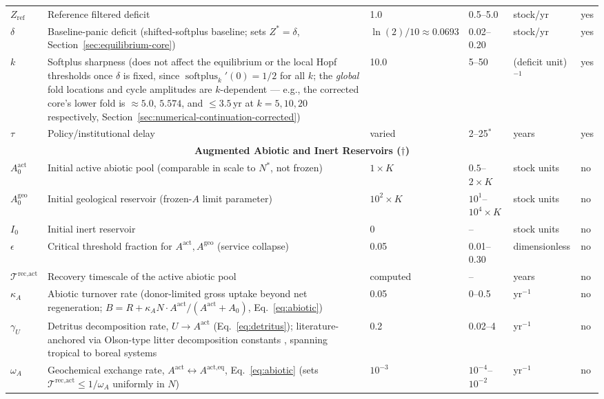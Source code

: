 \documentclass[twocolumn,10pt]{article}
\begin{document}
\begin{table}[t]
\begin{tabularx}{\textwidth}{l X l l l l}
\(Z_{\text{ref}}\) & Reference filtered deficit & 1.0 & 0.5--5.0 & stock/yr & yes \\
\(\delta\) & Baseline-panic deficit (shifted-softplus baseline; sets $Z^*=\delta$, Section~\ref{sec:equilibrium-core}) & \(\ln(2)/10\approx0.0693\) & 0.02--0.20 & stock/yr & yes \\
\(k\) & Softplus sharpness (does not affect the equilibrium or the local Hopf thresholds once $\delta$ is fixed, since $\operatorname{softplus}_k'(0)=1/2$ for all $k$; the \emph{global} fold locations and cycle amplitudes are $k$-dependent --- e.g., the corrected core's lower fold is $\approx5.0$, $5.574$, and $\le3.5$\,yr at $k=5,10,20$ respectively, Section~\ref{sec:numerical-continuation-corrected}) & 10.0 & 5--50 & (deficit unit)\(^{-1}\) & yes \\
\(\tau\) & Policy/institutional delay & varied & 2--25\(^{*}\) & years & yes \\
\midrule
\multicolumn{6}{c}{\textbf{Augmented Abiotic and Inert Reservoirs ($\dagger$)}} \\
\(A^{\text{act}}_0\) & Initial active abiotic pool (comparable in scale to \(N^*\), not frozen) & \(1\times K\) & \(0.5\)--\(2\times K\) & stock units & no \\
\(A^{\text{geo}}_0\) & Initial geological reservoir (frozen-$A$ limit parameter) & \(10^2 \times K\) & \(10^1\)--\(10^4 \times K\) & stock units & no \\
\(I_0\) & Initial inert reservoir & 0 & -- & stock units & no \\
\(\epsilon\) & Critical threshold fraction for \(A^{\text{act}},A^{\text{geo}}\) (service collapse) & 0.05 & 0.01--0.30 & dimensionless & no \\
\(\mathcal{T}^{\text{rec},\text{act}}\) & Recovery timescale of the active abiotic pool & computed & -- & years & no \\
\(\kappa_A\) & Abiotic turnover rate (donor-limited gross uptake beyond net regeneration; $B=R+\kappa_A N\cdot A^{\text{act}}/(A^{\text{act}}+A_0)$, Eq.~\eqref{eq:abiotic}) & 0.05 & 0--0.5 & yr\(^{-1}\) & no \\
\(\gamma_U\) & Detritus decomposition rate, $U\to A^{\text{act}}$ (Eq.~\eqref{eq:detritus}); literature-anchored via Olson-type litter decomposition constants \cite{olson1963}, spanning tropical to boreal systems & 0.2 & 0.02--4 & yr\(^{-1}\) & no \\
\(\omega_A\) & Geochemical exchange rate, \(A^{\text{act}}\leftrightarrow A^{\text{act},\text{eq}}\), Eq.~\eqref{eq:abiotic} (sets $\mathcal T^{\text{rec},\text{act}}\le1/\omega_A$ uniformly in $N$) & \(10^{-3}\) & \(10^{-4}\)--\(10^{-2}\) & yr\(^{-1}\) & no \\

\end{tabularx}
\end{table}
\end{document}
